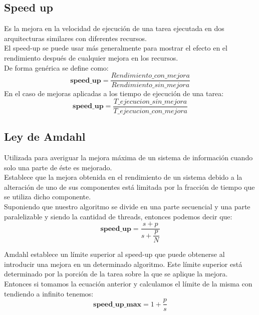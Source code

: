 \subsection{Speed up}

Es la mejora en la velocidad de ejecución de una tarea ejecutada en dos
arquitecturas similares con diferentes recursos.\\
El speed-up se puede usar más generalmente para mostrar el efecto en el
rendimiento después de cualquier mejora en los recursos.\\
De forma genérica se define como:
\begin{equation}
    \textbf{speed\_up} = \dfrac{Rendimiento\_con\_mejora}{Rendimiento\_sin\_mejora}
\end{equation}
En el caso de mejoras aplicadas a los tiempo de ejecución de una tarea:
\begin{equation}
    \textbf{speed\_up} = \dfrac{T\_ejecucion\_sin\_mejora}{T\_ejecucion\_con\_mejora}
\end{equation}

\subsection{Ley de Amdahl}

Utilizada para averiguar la mejora máxima de un sistema de información cuando
solo una parte de éste es mejorado.\\
Establece que la mejora obtenida en el rendimiento de un sistema debido a la
alteración de uno de sus componentes está limitada por la fracción de tiempo
que se utiliza dicho componente.\\

Suponiendo que nuestro algoritmo se divide en una parte secuencial 
y una parte paralelizable  y siendo  la cantidad de threads,
entonces podemos decir que:
\begin{equation}
    \textbf{speed\_up} = \dfrac{s+p}{s+\dfrac{p}{N}}
\end{equation}

Amdahl establece un límite superior al speed-up que puede obtenerse al
introducir una mejora en un determinado algoritmo. Este límite superior está
determinado por la porción de la tarea sobre la que se aplique la mejora.
Entonces si tomamos la ecuación anterior y calculamos el límite de la misma con
 tendiendo a infinito tenemos:
\begin{equation}
    \textbf{speed\_up\_max} = 1 + \dfrac{p}{s}
\end{equation}
\newpage

